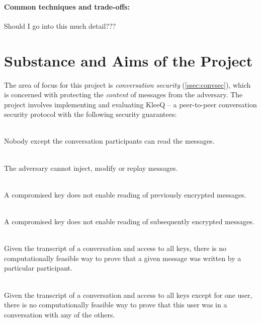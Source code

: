 \documentclass[a4paper, 12pt]{report}
\begin{document}
\paragraph{Common techniques and trade-offs:} \hspace{-8pt}
{\color{red}
Should I go into this much detail???}


\section{Substance and Aims of the Project}
The area of focus for this project is \emph{conversation security} (\cref{ssec:convsec}), which is concerned with protecting the \emph{content} of messages from the adversary. The project involves implementing and evaluating KleeQ \cite{reardon2007kleeq} -- a peer-to-peer conversation security protocol with the following security guarantees:
\begin{description}[labelindent=0.5cm, leftmargin=1.3cm]
    \item[Confidentiality] \hfill \\
        Nobody except the conversation participants can read the messages.
    \item[Intergrity of conversation] \hfill \\
        The adversary cannot inject, modify or replay messages.
    \item[Forward secrecy] \hfill \\
        A compromised key does not enable reading of previously encrypted messages.
    \item[Backward secrecy] \hfill \\
        A compromised key does not enable reading of subsequently encrypted messages.
    \item[Authorship repudiation] \hfill \\
        Given the transcript of a conversation and access to all keys, there is no computationally feasible way to prove that a given message was written by a particular participant.
    \item[Participation repudiation] \hfill \\
        Given the transcript of a conversation and access to all keys except for one user, there is no computationally feasible way to prove that this user was in a conversation with any of the others.
\end{description}
\end{document}
